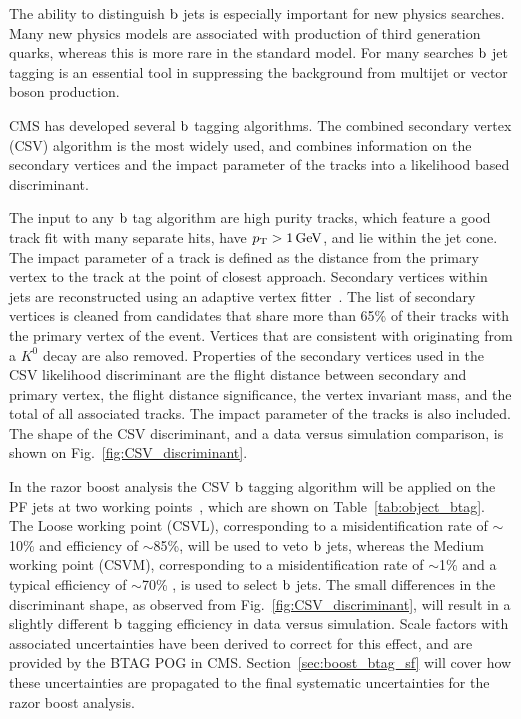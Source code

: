 The ability to distinguish $\mathrm{b}$ jets is especially important for new physics searches. Many new
physics models are associated with production of third generation quarks, whereas this is more rare
in the standard model. For many searches $\mathrm{b}$ jet tagging is an essential tool in suppressing
the background from multijet or vector boson production. 

CMS has developed several $\mathrm{b}$ tagging algorithms\cite{btag7TeV,btag8TeV}. The combined
secondary vertex (CSV) algorithm is the most widely used, and combines information on the secondary
vertices and the impact parameter of the tracks into a likelihood based discriminant. 
 
The input to any $\mathrm{b}$ tag algorithm are high purity tracks, which feature a good track fit with
many separate hits, have $p_{\mathrm{T}} > 1\,\text{Ge\hspace{-.08em}V}$, and lie within the jet cone. 
The impact parameter of a track is defined as the distance from the primary vertex to the track at
the point of closest approach.  
Secondary vertices within jets are reconstructed using an adaptive vertex
fitter~\cite{Fruhwirth:2007hz}. The list of secondary vertices is cleaned from candidates that
share more than 65\% of their tracks with the primary vertex of the event. Vertices that are
consistent with originating from a $K^0$ decay are also removed. Properties of the secondary
vertices used in the CSV likelihood discriminant are the flight distance between secondary and
primary vertex, the flight distance significance, the vertex invariant mass, and the total \pt of
all associated tracks. The impact parameter of the tracks is also included. The shape of the CSV
discriminant, and a data versus simulation comparison, is shown on Fig.~\ref{fig:CSV_discriminant}.

In the razor boost analysis the CSV $\mathrm{b}$ tagging algorithm will be applied on the PF jets at two
working points~\cite{BTagWP}, which are shown on Table~\ref{tab:object_btag}. 
The Loose working point (CSVL), corresponding to a misidentification rate of $\sim$10\% and
efficiency of $\sim$85\%, will be used to veto $\mathrm{b}$ jets, whereas the Medium working point
(CSVM), corresponding to a misidentification rate of $\sim$1\% and a typical efficiency of
$\sim$70\% , is used to select $\mathrm{b}$ jets.
The small differences in the discriminant shape, as observed from Fig.~\ref{fig:CSV_discriminant}, 
will result in a slightly different $\mathrm{b}$ tagging efficiency in data versus simulation. Scale
factors with associated uncertainties have been derived to correct for this effect, and are
provided by the BTAG POG in CMS. Section~\ref{sec:boost_btag_sf} will cover how these
uncertainties are propagated to the final systematic uncertainties for the razor boost analysis. 

